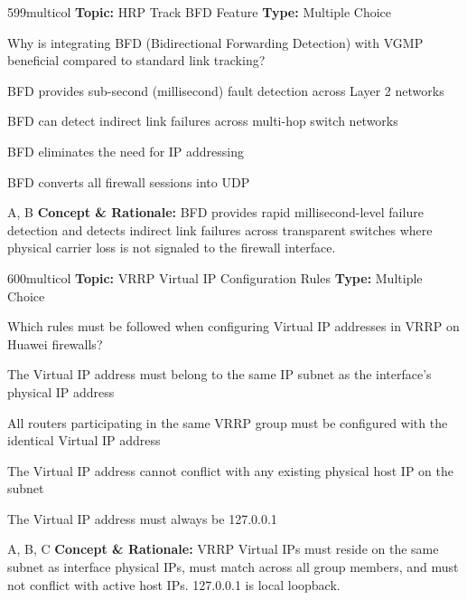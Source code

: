 \begin{qcard}{599}{multicol}
\textcolor{darkslate!75}{\small\textbf{Topic:} HRP Track BFD Feature \hfill \textbf{Type:} Multiple Choice}\vspace{0.4em}\par
Why is integrating BFD (Bidirectional Forwarding Detection) with VGMP beneficial compared to standard link tracking?
\begin{qoptions}
\item BFD provides sub-second (millisecond) fault detection across Layer 2 networks
\item BFD can detect indirect link failures across multi-hop switch networks
\item BFD eliminates the need for IP addressing
\item BFD converts all firewall sessions into UDP
\end{qoptions}
\end{qcard}
\nopagebreak
\begin{explainbox}{A, B}
\textbf{Concept \& Rationale:} BFD provides rapid millisecond-level failure detection and detects indirect link failures across transparent switches where physical carrier loss is not signaled to the firewall interface.
\end{explainbox}

\begin{qcard}{600}{multicol}
\textcolor{darkslate!75}{\small\textbf{Topic:} VRRP Virtual IP Configuration Rules \hfill \textbf{Type:} Multiple Choice}\vspace{0.4em}\par
Which rules must be followed when configuring Virtual IP addresses in VRRP on Huawei firewalls?
\begin{qoptions}
\item The Virtual IP address must belong to the same IP subnet as the interface's physical IP address
\item All routers participating in the same VRRP group must be configured with the identical Virtual IP address
\item The Virtual IP address cannot conflict with any existing physical host IP on the subnet
\item The Virtual IP address must always be 127.0.0.1
\end{qoptions}
\end{qcard}
\nopagebreak
\begin{explainbox}{A, B, C}
\textbf{Concept \& Rationale:} VRRP Virtual IPs must reside on the same subnet as interface physical IPs, must match across all group members, and must not conflict with active host IPs. 127.0.0.1 is local loopback.
\end{explainbox}

